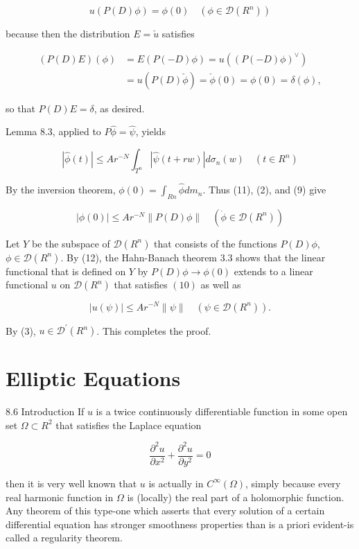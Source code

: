 \documentclass[10pt]{article}
\begin{document}
$$
u(P(D) \phi)=\phi(0) \quad\left(\phi \in \mathscr{D}\left(R^{n}\right)\right)
$$

because then the distribution $E=\check{u}$ satisfies

$$
\begin{aligned}
(P(D) E)(\phi) & =E(P(-D) \phi)=u\left((P(-D) \phi)^{\vee}\right) \\
& =u(P(D) \check{\phi})=\check{\phi}(0)=\phi(0)=\delta(\phi),
\end{aligned}
$$

so that $P(D) E=\delta$, as desired.

Lemma 8.3, applied to $P \hat{\phi}=\hat{\psi}$, yields

$$
|\hat{\phi}(t)| \leq A r^{-N} \int_{T^{n}}|\hat{\psi}(t+r w)| d \sigma_{n}(w) \quad\left(t \in R^{n}\right)
$$

By the inversion theorem, $\phi(0)=\int_{R n} \hat{\phi} d m_{n}$. Thus (11), (2), and (9) give

$$
|\phi(0)| \leq A r^{-N}\|P(D) \phi\| \quad\left(\dot{\phi} \in \mathscr{D}\left(R^{n}\right)\right)
$$

Let $Y$ be the subspace of $\mathscr{D}\left(R^{n}\right)$ that consists of the functions $P(D) \phi$, $\phi \in \mathscr{D}\left(R^{n}\right)$. By (12), the Hahn-Banach theorem 3.3 shows that the linear functional that is defined on $Y$ by $P(D) \phi \rightarrow \phi(0)$ extends to a linear functional $u$ on $\mathscr{D}\left(R^{n}\right)$ that satisfies $(10)$ as well as

$$
|u(\psi)| \leq A r^{-N}\|\psi\| \quad\left(\psi \in \mathscr{D}\left(R^{n}\right)\right) .
$$

By (3), $u \in \mathscr{D}^{\prime}\left(R^{n}\right)$. This completes the proof.

\section{Elliptic Equations}
8.6 Introduction If $u$ is a twice continuously differentiable function in some open set $\Omega \subset R^{2}$ that satisfies the Laplace equation

$$
\frac{\partial^{2} u}{\partial x^{2}}+\frac{\partial^{2} u}{\partial y^{2}}=0
$$

then it is very well known that $u$ is actually in $C^{\infty}(\Omega)$, simply because every real harmonic function in $\Omega$ is (locally) the real part of a holomorphic function. Any theorem of this type-one which asserts that every solution of a certain differential equation has stronger smoothness properties than is a priori evident-is called a regularity theorem.
\end{document}
